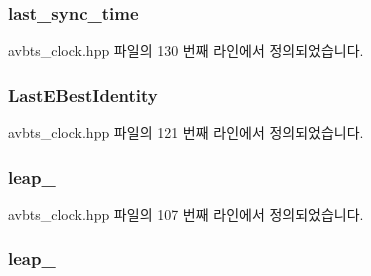 \subsubsection[{\texorpdfstring{last\+\_\+sync\+\_\+time}{last_sync_time}}]{ last\+\_\+sync\+\_\+time\hspace{0.3cm}{\ttfamily [private]}}\hypertarget{class_i_e_e_e1588_clock_a19383c316c2d87c58ea541a65ec3acdf}{}\label{class_i_e_e_e1588_clock_a19383c316c2d87c58ea541a65ec3acdf}


avbts\+\_\+clock.\+hpp 파일의 130 번째 라인에서 정의되었습니다.

\subsubsection[{\texorpdfstring{Last\+E\+Best\+Identity}{LastEBestIdentity}}]{ Last\+E\+Best\+Identity\hspace{0.3cm}{\ttfamily [private]}}\hypertarget{class_i_e_e_e1588_clock_aecec9d272ce3010f56716cdaf7bd1e5c}{}\label{class_i_e_e_e1588_clock_aecec9d272ce3010f56716cdaf7bd1e5c}


avbts\+\_\+clock.\+hpp 파일의 121 번째 라인에서 정의되었습니다.

\subsubsection[{\texorpdfstring{leap\+\_\+59}{leap_59}}]{ leap\+\_\hspace{0.3cm}{\ttfamily [private]}}\hypertarget{class_i_e_e_e1588_clock_a05870a92432a902b7451f6de8578838f}{}\label{class_i_e_e_e1588_clock_a05870a92432a902b7451f6de8578838f}


avbts\+\_\+clock.\+hpp 파일의 107 번째 라인에서 정의되었습니다.

\subsubsection[{\texorpdfstring{leap\+\_\+61}{leap_61}}]{ leap\+\_\hspace{0.3cm}{\ttfamily [private]}}\hypertarget{class_i_e_e_e1588_clock_a4de4b1da3e9662155b161e623b0bf2be}{}\label{class_i_e_e_e1588_clock_a4de4b1da3e9662155b161e623b0bf2be}



